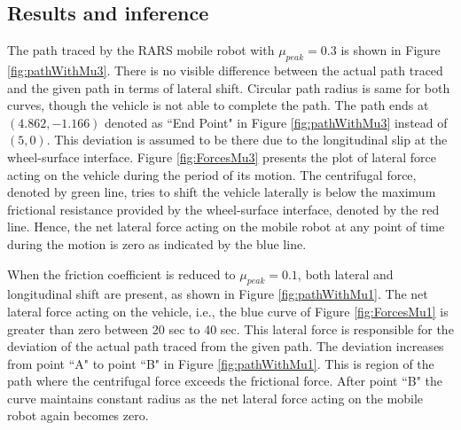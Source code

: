 {\subsection{Results and inference}
The path traced by the RARS mobile robot  with  $\mu_{peak} =0.3$ is shown in Figure \ref{fig:pathWithMu3}. There is no visible difference between the  actual path traced  and the given path in terms of lateral shift. Circular path radius is same for both curves, though the vehicle is not able to complete the path. The path ends at ${(4.862,-1.166)}$ denoted as ``End Point" in  Figure \ref{fig:pathWithMu3} instead of  ${(5,0)}$. This deviation is assumed to be there due to the longitudinal slip at the wheel-surface interface.  Figure \ref{fig:ForcesMu3} presents the plot of lateral force acting on the vehicle during the period of its motion. The centrifugal force, denoted by green line,  tries to shift the vehicle laterally is below the maximum frictional resistance provided by the wheel-surface interface, denoted by the red line. Hence, the net lateral force acting on the mobile robot at any point of time during the motion is zero as indicated by the blue line.

When the friction coefficient is reduced to  $\mu_{peak} =0.1$, both lateral and longitudinal shift are present, as shown in Figure \ref{fig:pathWithMu1}. The  net lateral force acting on the vehicle, i.e., the blue curve of Figure \ref{fig:ForcesMu1} is greater than zero between 20 sec to 40 sec. This lateral force is responsible for the deviation of the actual path traced from the given path. The deviation increases from point ``A" to point ``B" in Figure \ref{fig:pathWithMu1}. This is region of the path where the centrifugal force exceeds the frictional force. After point ``B" the curve maintains constant radius as the net lateral force acting on the mobile robot again becomes zero. 

}
